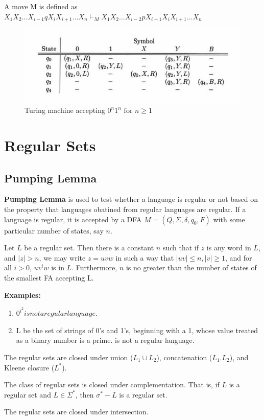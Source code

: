 \documentclass[a4paper,oneside]{book}
\begin{document}
A move M is defined as $X_1X_2\ldots X_{i- 1}qX_iX_{ i+1}\ldots X_n \vdash_M X_1X_2\ldots X_{i-2}pX_{i- 1}X_iX_{ i+1}\ldots X_n$
\begin{figure}[H]
\includegraphics[width=\textwidth,height=\textheight/3]{Images/turingmachine.jpeg}
\caption{Turing machine accepting $0^n1^n \text{ for } n \ge 1$}
\label{fig:turing_machine}
\end{figure}
\unboldmath
\chapter{Regular Sets}
\section{Pumping Lemma}
\textbf{Pumping Lemma} is used to test whether a language is regular or not based on the property that languages obatined from regular languages are regular. If a language is regular,  it is accepted by a DFA $M = (Q, \Sigma, \delta, q_0, F)$ with some particular number of states,  say $n$. 
\begin{lemma}
 Let $L$ be a regular set. Then there is a constant $n$ such that if $z$ is any word in $L$, and $|z| > n$, we may write $z = uvw$ in such a way that $|uv| \le n, |v| \ge 1$, and for all $i > 0$, $uv^iw$ is in $L$. Furthermore, $n$ is no greater than the number of states of the smallest FA accepting L.
\end{lemma}
\textbf{Examples:}
\begin{enumerate}
\item $0^{i^2} is not a regular language$.
\item  L be the set of strings of 0's and 1's, beginning with a 1, whose value treated as a binary number is a prime. is not a regular language.
 \end{enumerate}
\begin{theorem}
The regular sets are closed under union ($L_1 \cup L_2$), concatenation ($L_1 . L_2$), and Kleene closure ($L^*$).
\end{theorem}
\begin{theorem}
The class of regular sets is closed under complementation. That is, if $L$ is a regular set and $L \in \Sigma^*$,  then $\sigma^* - L$ is a regular set.
\end{theorem}
\begin{theorem}
The regular sets are closed under intersection.
\end{theorem}
\end{document}
